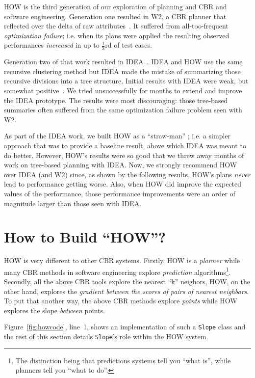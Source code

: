 \documentclass[conference]{IEEEtran}
\newcommand{\fig}[1]{Figure~\ref{fig:#1}}
\begin{document}
HOW is the third
generation of our exploration of  planning and CBR and software engineering.
Generation one  resulted in
 W2, a CBR planner that reflected over the delta of raw  attributes~\cite{6600685}. It suffered from all-too-frequent {\em optimization failure}; i.e. when its plans were applied the resulting observed
performances {\em increased} in up to $\frac{1}{3}$rd of test cases.

Generation two of that work resulted in  IDEA~\cite{me12c}.
IDEA and HOW use the    same recursive clustering
method but IDEA made the mistake of  summarizing those
recursive divisions into a tree structure. Initial results with IDEA were weak, but somewhat
positive~\cite{me12c}. We tried unsuccessfully for  months to extend and improve
the IDEA prototype. The results were most discouraging: those tree-based summaries often suffered
from the same optimization failure problem seen with W2. 

As part of the IDEA work, we built HOW as a ``straw-man'' ; i.e. a  simpler
approach that was  to provide a baseline result,  above which IDEA was meant
to do better.   However, HOW's results were so good that we  threw away months
of work on tree-based planning with IDEA. Now, we strongly recommend HOW
over IDEA (and W2) since, as shown by the following results, HOW's plans {\em never} lead to performance getting worse. Also, when HOW did improve the expected values of the performance,
those performance improvements were an order of magnitude larger than those seen
with IDEA.

\section{How to Build ``HOW''?}\label{sec:mm}

HOW is very different to other CBR systems. Firstly, HOW is a {\em planner} while many
CBR methods in software engineering explore  {\em prediction} algorithms\footnote{The distinction being that
predictions systems tell you ``what is'', while planners tell you ``what to do''.}.
Secondly, all the above CBR tools explore the nearest ``k'' neighors,
HOW, on the other hand, explores the {\em gradient between the scores of pairs of nearest neighbors}. 
To put that another way, the above CBR methods explore {\em points} while
HOW explores the slope {\em between} points.

\fig{howcode}, line~1, shows  an implementation of such a {\tt Slope} class and
the rest
of this section  details   {\tt Slope}'s role within the HOW system.
\end{document}
